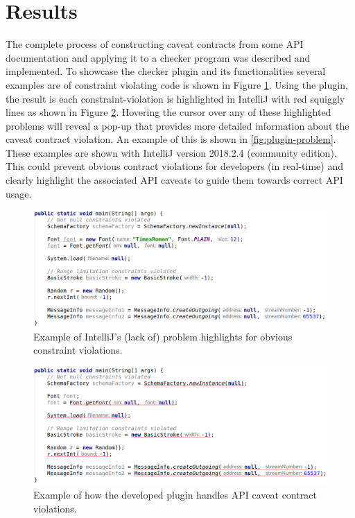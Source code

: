 \section{Results}
\label{sec:contract-results}
The complete process of constructing caveat contracts from some API documentation and applying it to a checker program was described and implemented. To showcase the checker plugin and its functionalities several examples are of constraint violating code is shown in Figure \ref{fig:plugin-inspection-off}. Using the plugin, the result is each constraint-violation is highlighted in IntelliJ with red squiggly lines as shown in Figure \ref{fig:plugin-inspection-on}. Hovering the cursor over any of these highlighted problems will reveal a pop-up that provides more detailed information about the caveat contract violation. An example of this is shown in \ref{fig:plugin-problem}. These examples are shown with IntelliJ version 2018.2.4 (community edition). This could prevent obvious contract violations for developers (in real-time) and clearly highlight the associated API caveats to guide them towards correct API usage.

\begin{figure}[h]
	\label{fig:plugin-inspection-off}
	\centering
	\includegraphics[width=\textwidth]{figs/plugin-inspection-off.png}
	\caption{Example of IntelliJ's (lack of) problem highlights for obvious constraint violations.}
\end{figure}

\begin{figure}[h]
	\label{fig:plugin-inspection-on}
	\centering
	\includegraphics[width=\textwidth]{figs/plugin-inspection-on.png}
	\caption{Example of how the developed plugin handles API caveat contract violations.}
\end{figure}

